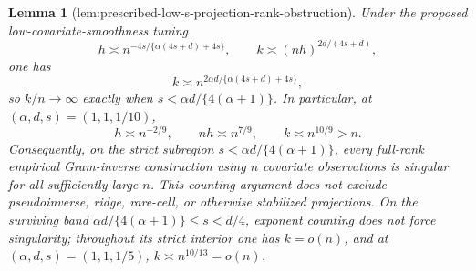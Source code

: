 \documentclass{article}
\newtheorem{lemma}{Lemma}
\begin{document}
\begin{lemma}[lem:prescribed-low-s-projection-rank-obstruction]\label{lem:prescribed-low-s-projection-rank-obstruction}
Under the proposed low-covariate-smoothness tuning
\[
h\asymp n^{-4s/\{\alpha(4s+d)+4s\}},
\qquad
k\asymp(nh)^{2d/(4s+d)},
\]
one has
\[
k\asymp n^{2\alpha d/\{\alpha(4s+d)+4s\}},
\]
so \(k/n\to\infty\) exactly when \(s<\alpha d/\{4(\alpha+1)\}\). In particular, at \((\alpha,d,s)=(1,1,1/10)\),
\[
h\asymp n^{-2/9},\qquad nh\asymp n^{7/9},\qquad k\asymp n^{10/9}>n.
\]
Consequently, on the strict subregion \(s<\alpha d/\{4(\alpha+1)\}\), every full-rank empirical Gram-inverse construction using \(n\) covariate observations is singular for all sufficiently large \(n\). This counting argument does not exclude pseudoinverse, ridge, rare-cell, or otherwise stabilized projections. On the surviving band \(\alpha d/\{4(\alpha+1)\}\le s<d/4\), exponent counting does not force singularity; throughout its strict interior one has \(k=o(n)\), and at \((\alpha,d,s)=(1,1,1/5)\), \(k\asymp n^{10/13}=o(n)\).
\end{lemma}
\end{document}
